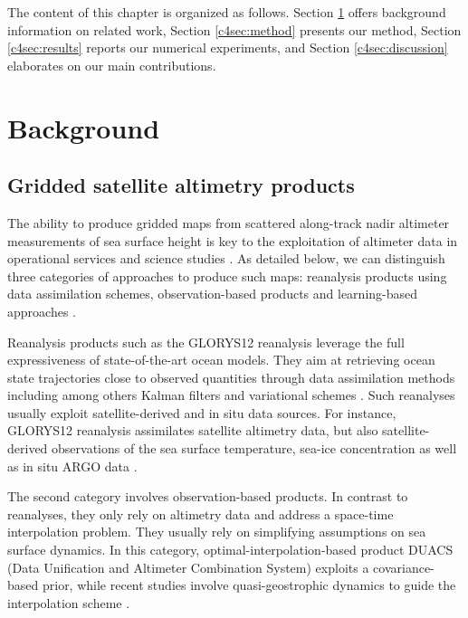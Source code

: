 \begin{bibunit}
    
The content of this chapter is organized as follows. Section \ref{c4sec:background} offers background information on related work, Section \ref{c4sec:method} presents our method, Section \ref{c4sec:results} reports our numerical experiments, and Section \ref{c4sec:discussion} elaborates on our main contributions.




\section{Background}
\label{c4sec:background}
\subsection*{Gridded satellite altimetry products}
\label{c4ssec:interpolation}
The ability to produce gridded maps from scattered along-track nadir altimeter measurements of sea surface height is key to the exploitation of altimeter data in operational services and science studies \cite{abdallaAltimetryFutureBuilding2021}.
As detailed below, we can distinguish three categories of approaches to produce such maps: reanalysis products \cite{jean-michelCopernicusGlobal122021} using data assimilation schemes, observation-based products \cite{taburetDUACSDT2018252019} and learning-based approaches \cite{fabletENDTOENDPHYSICSINFORMEDREPRESENTATION2021}.

Reanalysis products such as the GLORYS12 reanalysis \cite{jean-michelCopernicusGlobal122021} leverage the full expressiveness of state-of-the-art ocean models. They aim at retrieving ocean state trajectories close to observed quantities through data assimilation methods including among others Kalman filters and variational schemes \cite{carrassiDataAssimilationGeosciences2018}. Such reanalyses usually exploit satellite-derived and in situ data sources. For instance, GLORYS12 reanalysis assimilates satellite altimetry data, but also satellite-derived observations of the sea surface temperature, sea-ice concentration as well as in situ ARGO data  \cite{wongArgoData19992020}.


The second category involves observation-based products. In contrast to reanalyses, they only rely on altimetry data and address a space-time interpolation problem. They usually rely on simplifying assumptions on sea surface dynamics. In this category, optimal-interpolation-based product DUACS (Data Unification and Altimeter Combination System) \cite{taburetDUACSDT2018252019} exploits a covariance-based prior, while recent studies involve quasi-geostrophic dynamics to guide the interpolation scheme \cite{guillouMappingAltimetryForthcoming2021,ballarottaDynamicMappingAlongTrack2020}.


\end{bibunit}
